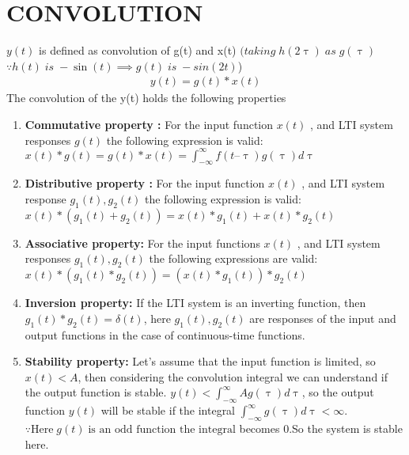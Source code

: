 \documentclass[journal,12pt,twocolumn]{IEEEtran}
\begin{document}
\section*{CONVOLUTION}
 $y(t)$ is defined as convolution of g(t) and x(t) $ (taking \; h(2\uptau)\; as\; g(\uptau)$ $\because h(t) \;is \; -\sin(t) \implies g(t) \;is\; -sin(2t)$)
\begin{align}
    y(t) = g(t) * x(t) 
\end{align}
The convolution of the y(t) holds the following properties 
\begin{enumerate}
    \item  \textbf{Commutative property :}  For the input function $x(t)$ , and LTI system responses $g(t)$  the following expression is valid:\\
    $x(t)*g(t)=g(t)*x(t)=\int_{-\infty}^{\infty}f(t–\uptau)g(\uptau)d\uptau$
    \item  \textbf{Distributive property :}
    For the input function $x(t)$ , and LTI system response $g_1(t), g_2(t)$  the following expression is valid:\\ $x(t)*(g_1(t)+g_2(t))=x(t)*g_1(t)+x(t)*g_2(t)$
    \item  \textbf{Associative property:}
    For the input functions $x(t)$ , and LTI system responses $g_1(t), g_2(t)$  the following expressions are valid:\\ $x(t)*(g_1(t)*g_2(t))=(x(t)*g_1(t))*g_2(t)$
    \item \textbf{Inversion property:}
    If the LTI system is an inverting function, then $g_1(t)*g_2(t)=\delta(t) $, here $g_1(t), g_2(t)$ are responses of the input and output functions in the case of continuous-time functions.
    \item \textbf{Stability property:}
    Let’s assume that the input function is limited, so $x(t)<A$, then considering the convolution integral we can understand if the output function is stable. $y(t)<\int_{-\infty}^{\infty} Ag(\uptau)d\uptau$, so the output function $y(t)$ will be stable if the integral $\int_{-\infty}^{\infty} g(\uptau)d\uptau < \infty$. $\because \text{Here} \; g(t) \; \text{is an odd function the integral}$ becomes 0.So the system is stable here.
\end{enumerate}
\end{document}
